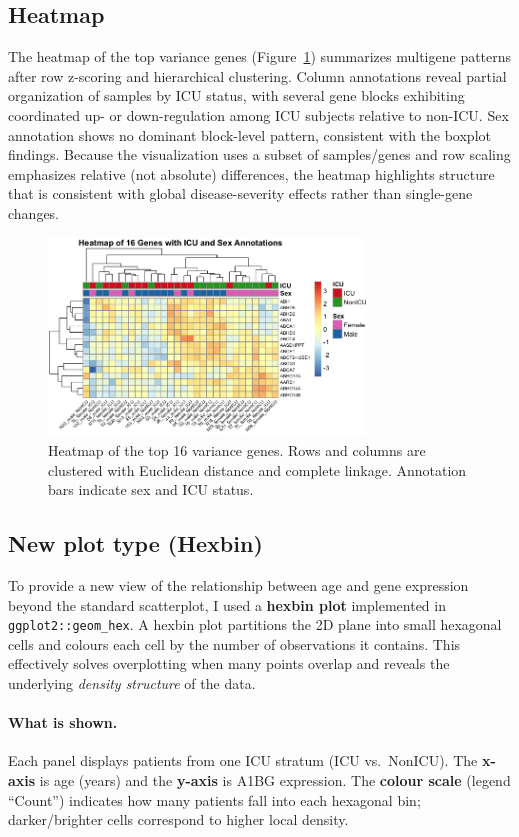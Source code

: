 \documentclass[11pt]{article}
\begin{document}
\subsection{Heatmap}
The heatmap of the top variance genes (Figure~\ref{fig:heatmap}) summarizes multigene patterns after row z-scoring and hierarchical clustering. Column annotations reveal partial organization of samples by ICU status, with several gene blocks exhibiting coordinated up- or down-regulation among ICU subjects relative to non-ICU. Sex annotation shows no dominant block-level pattern, consistent with the boxplot findings. Because the visualization uses a subset of samples/genes and row scaling emphasizes relative (not absolute) differences, the heatmap highlights structure that is consistent with global disease-severity effects rather than single-gene changes.
\begin{figure}[H]
\centering
\includegraphics[width=0.75\textwidth]{fig4_heatmap.png}
\caption{Heatmap of the top 16 variance genes. Rows and columns are clustered with Euclidean distance and complete linkage. Annotation bars indicate sex and ICU status.}
\label{fig:heatmap}
\end{figure}

\subsection{New plot type (Hexbin)}

To provide a new view of the relationship between age and gene expression beyond the standard scatterplot, I used a \textbf{hexbin plot} implemented in \texttt{ggplot2::geom\_hex}. A hexbin plot partitions the 2D plane into small hexagonal cells and colours each cell by the number of observations it contains. This effectively solves overplotting when many points overlap and reveals the underlying \emph{density structure} of the data.

\paragraph{What is shown.}
Each panel displays patients from one ICU stratum (ICU vs.\ NonICU). The \textbf{x-axis} is age (years) and the \textbf{y-axis} is A1BG expression. The \textbf{colour scale} (legend ``Count'') indicates how many patients fall into each hexagonal bin; darker/brighter cells correspond to higher local density.
\end{document}
